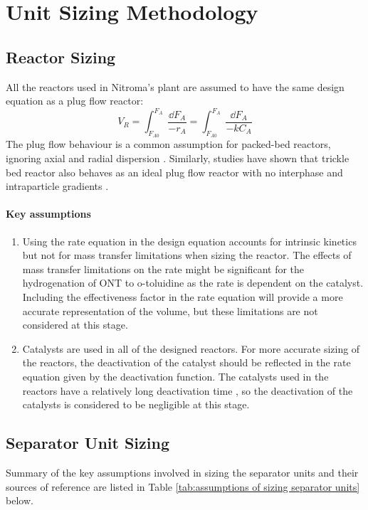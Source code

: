 \section{Unit Sizing Methodology}
\label{app:sizing}
\subsection{Reactor Sizing}

All the reactors used in Nitroma's plant are assumed to have the same design equation as a plug flow reactor:
\begin{equation}
    V_R = \int_{F_{A0}}^{F_{A}} \frac{\dd F_A}{-r_A} = \int_{F_{A0}}^{F_{A}} \frac{\dd F_A}{-kC_A}
    \label{reactor_sizing}
\end{equation}
The plug flow behaviour is a common assumption for packed-bed reactors, ignoring axial and radial dispersion \cite{froment_chemical_nodate}. Similarly, studies have shown that  trickle bed reactor also behaves as an ideal plug flow reactor with no interphase and intraparticle gradients \cite{p_a_ramachandran_recent_1987}.

\paragraph{Key assumptions}
\begin{enumerate}
    \item Using the rate equation in the design equation accounts for intrinsic kinetics but not for mass transfer limitations when sizing the reactor. The effects of mass transfer limitations on the rate might be significant for the hydrogenation of ONT to o-toluidine as the rate is dependent on the catalyst. Including the effectiveness factor in the rate equation will provide a more accurate representation of the volume, but these limitations are not considered at this stage.
    \item Catalysts are used in all of the designed reactors. For more accurate sizing of the reactors, the deactivation of the catalyst should be reflected in the rate equation given by the deactivation function. The catalysts used in the reactors have a relatively long deactivation time \cite{temizel_novel_2020}, so the deactivation of the catalysts is considered to be negligible at this stage.
\end{enumerate}

\subsection{Separator Unit Sizing}
Summary of the key assumptions involved in sizing the separator units and their sources of reference are listed in Table \ref{tab:assumptions of sizing separator units} below. 

